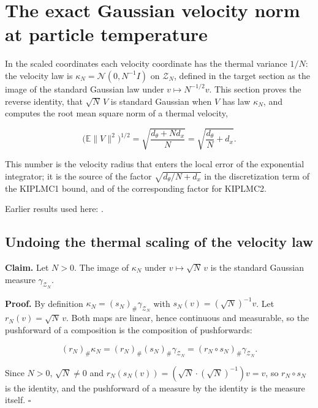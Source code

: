 \documentclass[11pt,a4paper]{report}
\begin{document}
\section{\texorpdfstring{The exact Gaussian velocity norm at particle temperature}{The exact Gaussian velocity norm at particle temperature}}
\label{proof-module-KIPLMC-Moments-lean}


In the scaled coordinates each velocity coordinate has the thermal variance \(1/N\): the velocity law is \(\kappa_N=\mathcal N(0,N^{-1}I)\) on \(\mathcal Z_N\), defined in the target section as the image of the standard Gaussian law under \(v\mapsto N^{-1/2}v\). This section proves the reverse identity, that \(\sqrt N\,V\) is standard Gaussian when \(V\) has law \(\kappa_N\), and computes the root mean square norm of a thermal velocity,


\[\bigl(\mathbb E\|V\|^2\bigr)^{1/2}=\sqrt{\frac{d_\theta+Nd_x}N}=\sqrt{\frac{d_\theta}N+d_x}.\]


This number is the velocity radius that enters the local error of the exponential integrator; it is the source of the factor \(\sqrt{d_\theta/N+d_x}\) in the discretization term of the KIPLMC1 bound, and of the corresponding factor for KIPLMC2.



Earlier results used here: \cite[Section~3.40]{LangevinLean2026Kinetic}.
\subsection{\texorpdfstring{Undoing the thermal scaling of the velocity law}{Undoing the thermal scaling of the velocity law}}
\label{report-step-KIPLMC-Moments-lean-1}


\textbf{Claim.} Let \(N>0\). The image of \(\kappa_N\) under \(v\mapsto\sqrt N\,v\) is the standard Gaussian measure \(\gamma_{\mathcal Z_N}\).




\textbf{Proof.} By definition \(\kappa_N=(s_N)_\#\gamma_{\mathcal Z_N}\) with \(s_N(v)=(\sqrt N)^{-1}v\). Let \(r_N(v)=\sqrt N\,v\). Both maps are linear, hence continuous and measurable, so the pushforward of a composition is the composition of pushforwards:


\[(r_N)_\#\kappa_N=(r_N)_\#(s_N)_\#\gamma_{\mathcal Z_N}=(r_N\circ s_N)_\#\gamma_{\mathcal Z_N}.\]


Since \(N>0\), \(\sqrt N\ne0\) and \(r_N(s_N(v))=(\sqrt N\cdot(\sqrt N)^{-1})v=v\), so \(r_N\circ s_N\) is the identity, and the pushforward of a measure by the identity is the measure itself. \(\square\)
\end{document}
